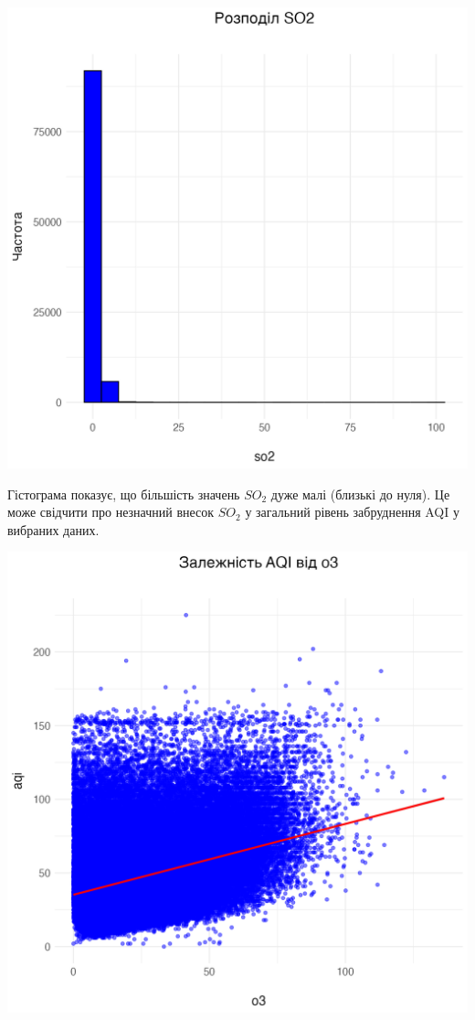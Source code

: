 \documentclass{article}
\begin{document}
\begin{enumerate}
    \includegraphics[width=6in]{plots/question2/so2_plot.png}
    
    Гістограма показує, що більшість значень $SO_2$ дуже малі (близькі до нуля).
    Це може свідчити про незначний внесок $SO_2$ у загальний рівень забруднення AQI у вибраних даних.   
    
    \includegraphics[width=6in]{plots/question2/scatter_plot.png}
    

\end{enumerate}
\end{document}
